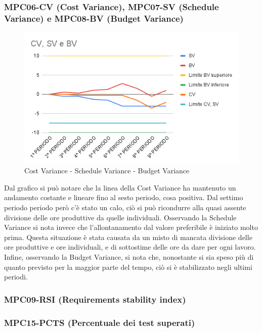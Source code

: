 \subsubsection{MPC06-CV (Cost Variance), MPC07-SV (Schedule Variance) e MPC08-BV (Budget Variance)}
\begin{figure}[H]
  \centering
  \includegraphics[width=0.7\linewidth]{grafici/CV_SV_BV.png}
  \caption{Cost Variance - Schedule Variance - Budget Variance}
\end{figure}
Dal grafico si può notare che la linea della Cost Variance ha mantenuto un andamento costante e lineare fino al sesto periodo, cosa positiva. Dal settimo periodo periodo però c'è stato un calo, ciò si può ricondurre alla quasi assente divisione delle ore produttive da quelle individuali. Osservando la Schedule Variance si nota invece che l'allontanamento dal valore preferibile è iniziato molto prima. Questa situazione è stata causata da un misto di mancata divisione delle ore produttive e ore individuali, e di sottostime delle ore da dare per ogni lavoro. Infine, osservando la Budget Variance, si nota che, nonostante si sia speso più di quanto previsto per la maggior parte del tempo, ciò si è stabilizzato negli ultimi periodi.
\subsubsection{MPC09-RSI (Requirements stability index)}
\subsubsection{MPC15-PCTS (Percentuale dei test superati)}
